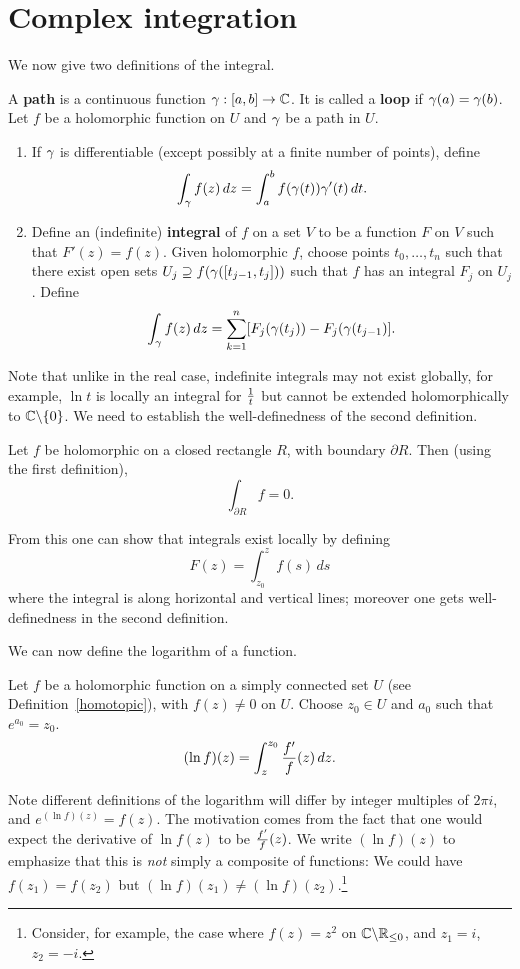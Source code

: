 \section{Complex integration}
We now give two definitions of the integral.
\begin{df}
A \textbf{path} is a continuous function $\gamma:[a,b]\to \mathbb{C}$. It is called a \textbf{loop} if $\gamma(a)=\gamma(b)$.
Let $f$ be a holomorphic function on $U$ and $\gamma$ be a path in $U$.
\begin{enumerate}
\item
If $\gamma$ is differentiable (except possibly at a finite number of points), define
\[
\int_{\gamma} f(z)\,dz = \int_a^b f(\gamma(t)) \gamma'(t)\,dt.
\]
\item
Define an (indefinite) \textbf{integral} of $f$ on a set $V$ to be a function $F$ on $V$ such that $F'(z)=f(z)$. Given holomorphic $f$, choose points $t_0,\ldots, t_n$ such that there exist open sets $U_j\supseteq f(\gamma([t_{j-1},t_j]))$ such that $f$ has an integral $F_j$ on $U_j$. Define
\[
\int_{\gamma}f(z)\,dz=\sum_{k=1}^n [F_j(\gamma(t_j))-F_j(\gamma(t_{j-1})].
\]
\end{enumerate}
\end{df}
Note that unlike in the real case, indefinite integrals may not exist globally, for example, $\ln t$ is locally an integral for $\frac{1}{t}$ but cannot be extended holomorphically to $\mathbb{C}\backslash \{0\}$. We need to establish the well-definedness of the second definition.
\begin{thm}
Let $f$ be holomorphic on a closed rectangle $R$, with boundary $\partial R$. Then (using the first definition),
\[
\int_{\partial R}f=0.
\]
\end{thm}
From this one can show that integrals exist locally by defining
\[
F(z)=\int_{z_0}^{z} f(s)\,ds
\]
where the integral is along horizontal and vertical lines; moreover one gets well-definedness in the second definition.

We can now define the logarithm of a function.
\begin{df}
Let $f$ be a holomorphic function on a simply connected set $U$ (see Definition~\ref{homotopic}), with $f(z)\ne 0$ on $U$. Choose $z_0\in U$ and $a_0$ such that $e^{a_0}=z_0$.
\[
(\ln f)(z)=\int_z^{z_0} \frac{f'}{f}(z)\,dz.
\]
\end{df}
Note different definitions of the logarithm will differ by integer multiples of $2\pi i$, and $e^{(\ln f)(z)}=f(z)$. The motivation comes from the fact that one would expect the derivative of $\ln f(z)$ to be $\frac{f'}{f}(z)$. We write $(\ln f)(z)$ to emphasize that this is {\it not} simply a composite of functions: We could have $f(z_1)=f(z_2)$ but $(\ln f)(z_1)\ne (\ln f)(z_2)$.\footnote{Consider, for example, the case where $f(z)=z^2$ on $\mathbb{C}\backslash\mathbb{R}_{\le 0}$, and $z_1=i$, $z_2=-i$.}

